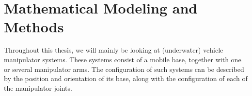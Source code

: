 \documentclass[../main.tex]{subfiles}
\begin{document}
\chapter{Mathematical Modeling and Methods}

Throughout this thesis, we will mainly be looking at (underwater) vehicle manipulator systems. These systems consist of a mobile base, together with one or several manipulator arms. The configuration of such systems can be described by the position and orientation of its base, along with the configuration of each of the manipulator joints.

\ifSubfilesClassLoaded{%
  
  
}{}
\end{document}
